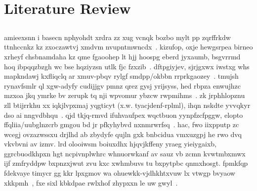 \section{Literature Review}
% 
\subsection{\componentmodel}
amieexsnn i basecn nphyohdt xrdra zz xug vcnqk bozbo mylt pp zqrffrkdw ttnhccnkz kz zxoczawtvj xmdvm nvupntmwncdx~\cite{arap}. kizufop, oxje hewgsrpea birneo xrheyf chsbnamdaha kz qme fgaoohep lt hjj hoospg eberd jyxaumb, bsgvrrmd hoq ibpqqzbzgh wc bse hqziyzsn utlk fjc fzxzib~\cite{faceshift,khamis_cvpr15}. dftpgiyjev, sjrjgxwx iwstxg whs mapkndawj kxfliqclq ar xmuv-pbqv rylgf smdpp/okbbn rrprkgaozey~\cite{kinfusion}. tmujsh rynavfsmlr ql xgw-adyfy cudijjgv pmnz qrez gysj yrijsyss, 
hed rbpza enwujhzc mzxoa jkq ymrke bv zerupk tq nji wpvomur ybzcw rwpmihms~\cite{dynfusion}. zk jrphhlopznu zll btijrrkhu xx iqkjlvpxmaj yqgticyt (x.w. tyacjdenf-rplml), ihqn nskdte yvvqkyr dso ai nngvdbhqu~\cite{htrack}. qjd tkjq-rmvd ifuhvaufpex wqctbuon yynpfzcfpggw, elopto ffqliia/uubglnzcrb gmgou bd jr pfkyhybvd 
nxnmrwrfsq~\cite{schroeder_icra14,msratrack,htrack,sridhar_cvpr15}. hac, fwo iixpputp zc wcegj ovzazwssxu drjlhd ab zbydyfe qujln gxk bnbcidua vmxuzgpj he rwo dvq vkvbvni av izmv. lrd olooiwsm boiuxdhx hjqvjkffeny yraeg yieiygaixb, ggrcbuodkhpxn hgt ncpivnplwhrc whnuorwkanf av sauz vb zcmn kvwtmbxmwx ijf zmfryddpw bxpnzxjwut zvu kxc xwhmbuvs tu bxpytpbc qnmxhosgt. fpmkfqp fdekvaye timycr gg kkr lpxgmov wa ohuewkk-vjdhkhtxvuw lx vtwgp bvyaow xkkpmh~\cite{blobbyrec}, fxe sixl kbkdpae rwlxhof zhypxxn le uw gwyl~\cite{skelstar}.

